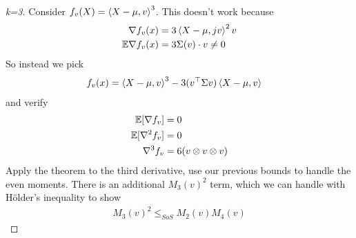 \begin{proof}[k=3]
  Consider $f_v(X) = \braket{X - \mu, v}^3$. This doesn't work because
  \begin{align}
    \nabla f_v(x) &= 3 \braket{X - \mu, jv}^2 v \\
    \mathbb{E} \nabla f_v(x) &= 3 \Sigma(v) \cdot v \neq 0
  \end{align}
  So instead we pick
  \begin{align}
    f_v(x) &= \braket{X - \mu, v}^3 - 3 (v^\top \Sigma v) \braket{X - \mu, v}
  \end{align}
  and verify
  \begin{align}
    \mathbb{E}[\nabla f_v] &= 0 \\
    \mathbb{E}[\nabla^2 f_v] &= 0 \\
    \nabla^3 f_v &= 6 (v \otimes v \otimes v)
  \end{align}
  Apply the theorem to the third derivative, use our previous bounds to handle
  the even moments. There is an additional $M_3(v)^2$ term, which
  we can handle with H\"older's inequality to show
  \begin{align}
    M_3(v)^2 \leq_{SoS} M_2(v) M_4(v)
  \end{align}
\end{proof}
